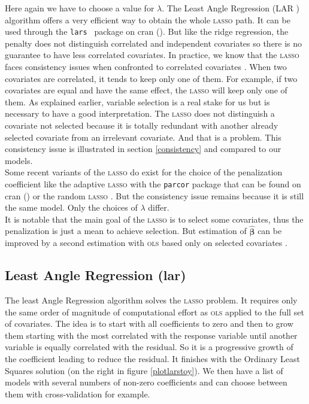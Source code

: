 \documentclass[12pt,a4paper]{report}
\begin{document}
		Here again we have to choose a value for $\lambda$.
	 The Least Angle Regression (\textsc{LAR} \cite{efron2004least}) algorithm offers a very efficient way to obtain the whole \textsc{lasso} path.  It can be used through the {\tt lars } package on {\sc cran} (\cite{packagelars}). But like the ridge regression, the penalty does not distinguish correlated and independent covariates so there is no guarantee to have less correlated covariates. In practice, we know that the \textsc{lasso} faces consistency issues when confronted to correlated covariates \cite{Zhao2006MSC}. When two covariates are correlated, it tends to keep only one of them. For example, if two covariates are equal and have the same effect, the \textsc{lasso} will keep only one of them. As explained earlier, variable selection is a real stake for us but is necessary to have a good interpretation. The \textsc{lasso} does not distinguish a covariate not selected because it is totally redundant with another already selected covariate from an irrelevant covariate. And that is a problem. This consistency issue is illustrated in section \ref{consistency} and compared to our models.\\



			 Some recent variants of the \textsc{lasso} do exist for the choice of the penalization coefficient like the adaptive \textsc{lasso} \cite{zou2006adaptive} with the {\tt parcor} package that can be found on {\sc cran} (\cite{packageparcor}) or the random \textsc{lasso} \cite{wang2011random}.  But the consistency issue remains because it is still the same model. Only the choices of $\lambda$ differ.\\
			 
			 It is notable that the main goal of the \textsc{lasso} is to select some covariates, thus the penalization is just a mean to achieve selection. But estimation of $\hat{\boldsymbol{\beta}}$ can be improved by a second estimation with \textsc{ols} based only on selected covariates \cite{SAM10088}.
		\subsection{Least Angle Regression  ({\sc lar})}
		The least Angle Regression algorithm solves the \textsc{lasso} problem.
		It requires only the same order of magnitude of computational effort as \textsc{ols} applied to the full set of covariates.
		The idea is to start with all coefficients to zero and then to grow them starting with the most correlated with the response variable until another variable is equally correlated with the residual. So it is a progressive growth of the coefficient leading to reduce the residual. It finishes with the Ordinary Least Squares solution (on the right in figure \ref{plotlarstoy}). We then have a list of models with several numbers of non-zero coefficients and can choose between them with cross-validation for example.\\
		
\end{document}
